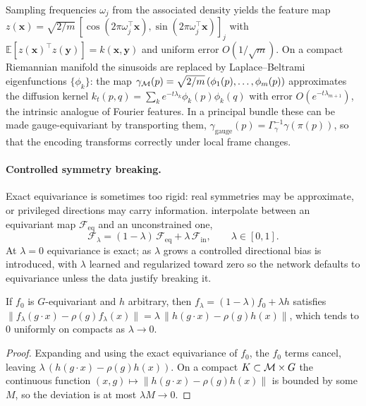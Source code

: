 Sampling frequencies $\omega_j$ from the associated density yields the feature
map $z(\mathbf{x}) = \sqrt{2/m}\,[\cos(2\pi\omega_j^{\!\top}\mathbf{x}),
\sin(2\pi\omega_j^{\!\top}\mathbf{x})]_j$ with $\mathbb{E}[z(\mathbf{x})^{\!\top}
z(\mathbf{y})] = k(\mathbf{x}, \mathbf{y})$ and uniform error $O(1/\sqrt{m})$. On
a compact Riemannian manifold the sinusoids are replaced by Laplace--Beltrami
eigenfunctions $\{\phi_k\}$: the map $\gamma_{\mathcal{M}}(p) = \sqrt{2/m}\,(\phi_1(p),
\ldots, \phi_m(p))$ approximates the diffusion kernel $k_t(p, q) = \sum_k
e^{-t\lambda_k}\phi_k(p)\phi_k(q)$ with error $O(e^{-t\lambda_{m+1}})$, the
intrinsic analogue of Fourier features. In a principal bundle these can be made
gauge-equivariant by transporting them, $\gamma_{\text{gauge}}(p) =
\Gamma_\gamma^{-1}\gamma(\pi(p))$, so that the encoding transforms correctly under
local frame changes.

\paragraph{Controlled symmetry breaking.}
Exact equivariance is sometimes too rigid: real symmetries may be approximate, or
privileged directions may carry information. \citet{vanderouderaa2024symmetry}
interpolate between an equivariant map $\mathcal{F}_{\text{eq}}$ and an
unconstrained one,
\[
  \mathcal{F}_\lambda = (1 - \lambda)\,\mathcal{F}_{\text{eq}} + \lambda\,
  \mathcal{F}_{\text{in}},
  \qquad \lambda \in [0, 1].
\]
At $\lambda = 0$ equivariance is exact; as $\lambda$ grows a controlled
directional bias is introduced, with $\lambda$ learned and regularized toward
zero so the network defaults to equivariance unless the data justify breaking it.

\begin{proposition}
\label{prop:gauge:symmetry-breaking}
If $f_0$ is $G$-equivariant and $h$ arbitrary, then $f_\lambda = (1 - \lambda)
f_0 + \lambda h$ satisfies $\|f_\lambda(g\cdot x) - \rho(g) f_\lambda(x)\| =
\lambda\,\|h(g\cdot x) - \rho(g) h(x)\|$, which tends to $0$ uniformly on compacts
as $\lambda \to 0$.
\end{proposition}

\begin{proof}
Expanding and using the exact equivariance of $f_0$, the $f_0$ terms cancel,
leaving $\lambda\,(h(g\cdot x) - \rho(g) h(x))$. On a compact $K \subset \mathcal{M}
\times G$ the continuous function $(x, g) \mapsto \|h(g\cdot x) - \rho(g) h(x)\|$
is bounded by some $M$, so the deviation is at most $\lambda M \to 0$.
\end{proof}

